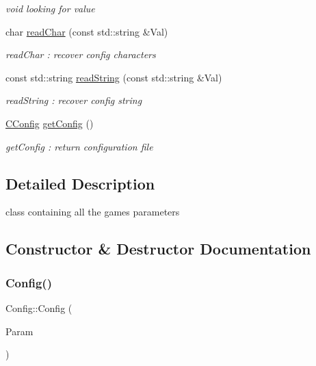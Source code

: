 \begin{Indent}
\begin{DoxyCompactItemize}
\begin{DoxyCompactList}\small\item\em void looking for value \end{DoxyCompactList}\item 
char \hyperlink{class_config_a554ca6c693d22e88fdc0a1e78eac0daf}{read\+Char} (const std\+::string \&Val)
\begin{DoxyCompactList}\small\item\em read\+Char \+: recover config characters \end{DoxyCompactList}\item 
const std\+::string \hyperlink{class_config_af6f437a43639fbcaaaa39ad5e4d3cba0}{read\+String} (const std\+::string \&Val)
\begin{DoxyCompactList}\small\item\em read\+String \+: recover config string \end{DoxyCompactList}\item 
\hyperlink{struct_c_config}{C\+Config} \hyperlink{class_config_a69e6510655afcb2b86e772cb67cb807a}{get\+Config} ()
\begin{DoxyCompactList}\small\item\em get\+Config \+: return configuration file \end{DoxyCompactList}\end{DoxyCompactItemize}
\end{Indent}


\subsection{Detailed Description}
class containing all the game\textquotesingle{}s parameters 

\subsection{Constructor \& Destructor Documentation}
\mbox{\label{class_config_a16c54796accfc2d9ffe6ded6f8b9dde2}} 
\subsubsection{\texorpdfstring{Config()}{Config()}}
{\footnotesize\ttfamily Config\+::\+Config (\begin{DoxyParamCaption}\item[{\hyperlink{struct_c_config}{C\+Config} \&}]{Param }\end{DoxyParamCaption})}



